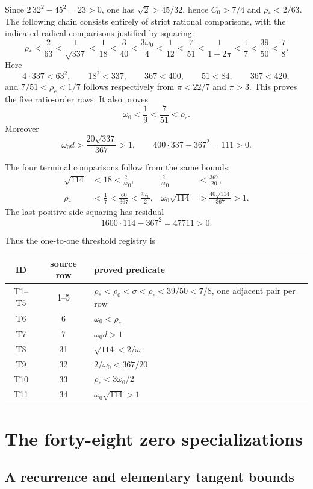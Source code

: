 \documentclass[11pt]{article}
\newcommand{\om}{\omega _0}
\newcommand{\rc}{\rho _c}
\newcommand{\rs}{\rho _*}
\begin{document}
Since \(2\,32^2-45^2=23>0\), one has
\(\sqrt2>45/32\), hence \(C_0>7/4\) and
\(\rs<2/63\).  The following chain consists entirely of strict rational
comparisons, with the indicated radical comparisons justified by squaring:
\[
 \rs<\frac2{63}<\frac1{\sqrt{337}}<\frac1{18}
 <\frac3{40}<\frac{3\om}{4}<\frac1{12}<\frac7{51}
 <\frac1{1+2\pi}<\frac17<\frac{39}{50}<\frac78.
\]
Here
\[
 4\cdot337<63^2,\qquad 18^2<337,\qquad 367<400,
 \qquad 51<84,\qquad 367<420,
\]
and \(7/51<\rc<1/7\) follows respectively from
\(\pi<22/7\) and \(\pi>3\).  This proves the five ratio-order rows.
It also proves
\[
 \om<\frac19<\frac7{51}<\rc.
\]
Moreover
\[
 \om d>\frac{20\sqrt{337}}{367}>1,
 \qquad 400\cdot337-367^2=111>0.
\]

The four terminal comparisons follow from the same bounds:
\begin{align*}
 \sqrt{114}&<18<\frac2\om,\qquad
 &\frac2\om&<\frac{367}{20},\\
 \rc&<\frac17<\frac{60}{367}<\frac{3\om}{2},
 &\om\sqrt{114}&>\frac{40\sqrt{114}}{367}>1.
\end{align*}
The last positive-side squaring has residual
\[
 1600\cdot114-367^2=47711>0.
\]

Thus the one-to-one threshold registry is
\begin{center}
\small
\begin{tabular}{ccl}
\toprule
ID&source row&proved predicate\\
\midrule
T1--T5&1--5&\(\rs<\rho _0<\sigma<\rc<39/50<7/8\), one adjacent pair per row\\
T6&6&\(\om<\rc\)\\
T7&7&\(\om d>1\)\\
T8&31&\(\sqrt{114}<2/\om\)\\
T9&32&\(2/\om<367/20\)\\
T10&33&\(\rc<3\om/2\)\\
T11&34&\(\om\sqrt{114}>1\)\\
\bottomrule
\end{tabular}
\end{center}

\section{The forty-eight zero specializations}

\subsection{A recurrence and elementary tangent bounds}
\end{document}
